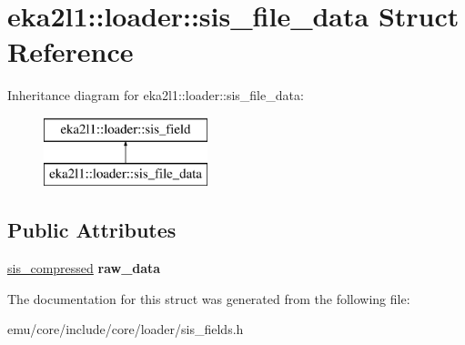 \hypertarget{structeka2l1_1_1loader_1_1sis__file__data}{}\section{eka2l1\+:\+:loader\+:\+:sis\+\_\+file\+\_\+data Struct Reference}
\label{structeka2l1_1_1loader_1_1sis__file__data}
Inheritance diagram for eka2l1\+:\+:loader\+:\+:sis\+\_\+file\+\_\+data\+:\begin{figure}[H]
\begin{center}
\leavevmode
\includegraphics[height=2.000000cm]{structeka2l1_1_1loader_1_1sis__file__data}
\end{center}
\end{figure}
\subsection*{Public Attributes}
\begin{DoxyCompactItemize}
\item 
\mbox{\label{structeka2l1_1_1loader_1_1sis__file__data_a8b85b9573b10e4b7fb90e7f0fb8c7170}} 
\mbox{\hyperlink{structeka2l1_1_1loader_1_1sis__compressed}{sis\+\_\+compressed}} {\bfseries raw\+\_\+data}
\end{DoxyCompactItemize}


The documentation for this struct was generated from the following file\+:\begin{DoxyCompactItemize}
\item 
emu/core/include/core/loader/sis\+\_\+fields.\+h\end{DoxyCompactItemize}
